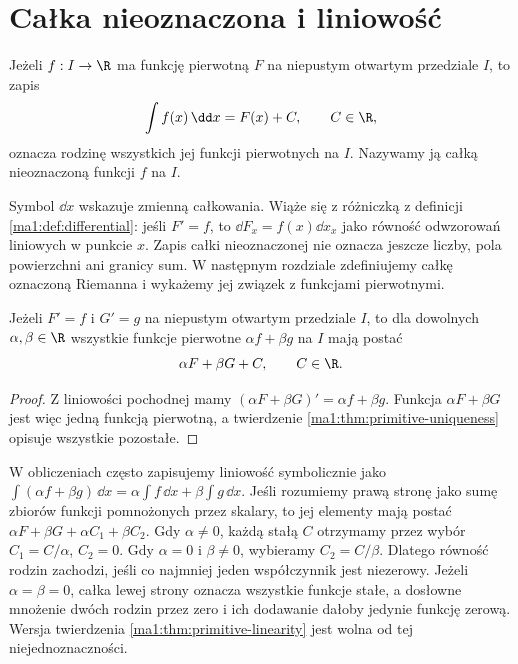 \section{Całka nieoznaczona i liniowość}
\begin{definicja}
\label{ma1:def:indefinite-integral}
Jeżeli $f:I\to\R$ ma funkcję pierwotną $F$ na niepustym otwartym przedziale $I$, to zapis
\[
 \int f(x)\,\dd x=F(x)+C,\qquad C\in\R,
\]
oznacza rodzinę wszystkich jej funkcji pierwotnych na $I$. Nazywamy ją całką nieoznaczoną funkcji $f$ na $I$.
\end{definicja}
Symbol $\dd x$ wskazuje zmienną całkowania. Wiąże się z różniczką z definicji \ref{ma1:def:differential}: jeśli $F'=f$, to $\dd F_x=f(x)\dd x_x$ jako równość odwzorowań liniowych w punkcie $x$. Zapis całki nieoznaczonej nie oznacza jeszcze liczby, pola powierzchni ani granicy sum. W następnym rozdziale zdefiniujemy całkę oznaczoną Riemanna i wykażemy jej związek z funkcjami pierwotnymi.

\begin{twierdzenie}
\label{ma1:thm:primitive-linearity}
Jeżeli $F'=f$ i $G'=g$ na niepustym otwartym przedziale $I$, to dla dowolnych $\alpha,\beta\in\R$ wszystkie funkcje pierwotne $\alpha f+\beta g$ na $I$ mają postać
\[
 \alpha F+\beta G+C,\qquad C\in\R.
\]
\end{twierdzenie}
\begin{proof}
Z liniowości pochodnej mamy $(\alpha F+\beta G)'=\alpha f+\beta g$. Funkcja $\alpha F+\beta G$ jest więc jedną funkcją pierwotną, a twierdzenie \ref{ma1:thm:primitive-uniqueness} opisuje wszystkie pozostałe.
\end{proof}
W obliczeniach często zapisujemy liniowość symbolicznie jako $\int(\alpha f+\beta g)\,\dd x=\alpha\int f\,\dd x+\beta\int g\,\dd x$. Jeśli rozumiemy prawą stronę jako sumę zbiorów funkcji pomnożonych przez skalary, to jej elementy mają postać $\alpha F+\beta G+\alpha C_1+\beta C_2$. Gdy $\alpha\ne0$, każdą stałą $C$ otrzymamy przez wybór $C_1=C/\alpha$, $C_2=0$. Gdy $\alpha=0$ i $\beta\ne0$, wybieramy $C_2=C/\beta$. Dlatego równość rodzin zachodzi, jeśli co najmniej jeden współczynnik jest niezerowy. Jeżeli $\alpha=\beta=0$, całka lewej strony oznacza wszystkie funkcje stałe, a dosłowne mnożenie dwóch rodzin przez zero i ich dodawanie dałoby jedynie funkcję zerową. Wersja twierdzenia \ref{ma1:thm:primitive-linearity} jest wolna od tej niejednoznaczności.

